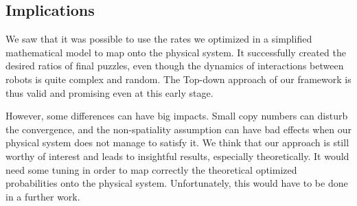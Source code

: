 	
	\subsection{Implications} %
	\label{sub:implications}
		We saw that it was possible to use the rates we optimized in a simplified mathematical model to map onto the physical system. It successfully created the desired ratios of final puzzles, even though the dynamics of interactions between robots is quite complex and random. The Top-down approach of our framework is thus valid and promising even at this early stage.
		
		However, some differences can have big impacts. Small copy numbers can disturb the convergence, and the non-spatiality assumption can have bad effects when our physical system does not manage to satisfy it. We think that our approach is still worthy of interest and leads to insightful results, especially theoretically. It would need some tuning in order to map correctly the theoretical optimized probabilities onto the physical system. Unfortunately, this would have to be done in a further work.
